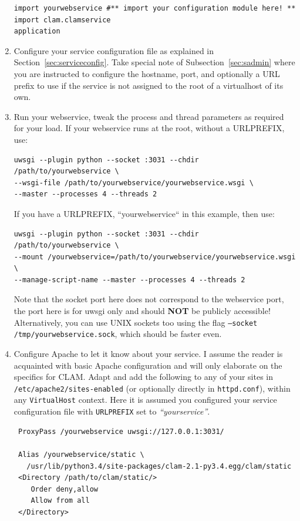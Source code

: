 \documentclass[a4paper,12pt,twoside,openright]{report}
\begin{document}
\begin{enumerate}[leftmargin=5mm]
{\begin{verbatim}
import yourwebservice #** import your configuration module here! **
import clam.clamservice
application\end{verbatim}
}
 
\item Configure your service configuration file as explained in
Section~\ref{sec:serviceconfig}. Take special note of
Subsection~\ref{sec:sadmin} where you are instructed to configure the
hostname, port, and optionally a URL prefix to use if the service is not
assigned to the root of a virtualhost of its own. 
\item Run your webservice, tweak the process and thread parameters as required
    for your load. If your webservice runs at the root, without a
    URLPREFIX, use:
{ \small
\begin{verbatim}
uwsgi --plugin python --socket :3031 --chdir /path/to/yourwebservice \ 
--wsgi-file /path/to/yourwebservice/yourwebservice.wsgi \
--master --processes 4 --threads 2
\end{verbatim}
}
If you have a URLPREFIX, ``yourwebservice`` in this example, then use:
{ \small
\begin{verbatim}
uwsgi --plugin python --socket :3031 --chdir /path/to/yourwebservice \
--mount /yourwebservice=/path/to/yourwebservice/yourwebservice.wsgi \
--manage-script-name --master --processes 4 --threads 2
\end{verbatim}
}

Note that the socket port here does not correspond to the webservice port, the
port here is for uwsgi only and should \textbf{NOT} be publicly accessible!
Alternatively, you can use UNIX sockets too using the flag \texttt{--socket
/tmp/yourwebservice.sock}, which should be faster even.
\item Configure Apache to let it know about your service. I assume the
reader is acquainted with basic Apache configuration and will only elaborate
on the specifics for CLAM. Adapt and add the following to any of your sites
in \texttt{/etc/apache2/sites-enabled} (or optionally directly in
\texttt{httpd.conf}), within any \texttt{VirtualHost} context. Here it is
assumed you configured your service configuration file with
\texttt{URLPREFIX} set to \emph{``yourservice''}.

{\small
\begin{verbatim}
 ProxyPass /yourwebservice uwsgi://127.0.0.1:3031/

 Alias /yourwebservice/static \ 
   /usr/lib/python3.4/site-packages/clam-2.1-py3.4.egg/clam/static
 <Directory /path/to/clam/static/>
    Order deny,allow
    Allow from all
 </Directory>
\end{verbatim}
}


\end{enumerate}
\end{document}
